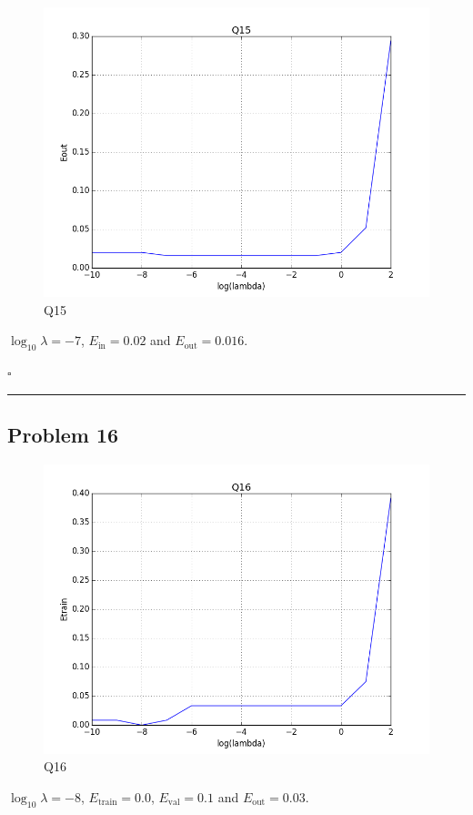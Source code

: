 \documentclass[12pt]{article}
\newcommand*{\QEDB}{\hfill\ensuremath{\square}}
\newcommand{\horrule}[1]{\rule{\linewidth}{#1}}
\begin{document}
\begin{figure}[h]
	\centering
	\includegraphics[scale=0.3]{Q15.png}
	\caption{Q15}
	\label{Q15}
\end{figure}
$\log_{10}\lambda=-7$, $E_{\text{in}}=0.02$ and $E_{\text{out}}=0.016$.

\QEDB

\horrule{0.5pt}

\subsection*{Problem 16}

\begin{figure}[h]
	\centering
	\includegraphics[scale=0.3]{Q16.png}
	\caption{Q16}
	\label{Q16}
\end{figure}
$\log_{10}\lambda=-8$, $E_{\text{train}}=0.0$, $E_{\text{val}}=0.1$ and $E_{\text{out}}=0.03$.

\end{document}
